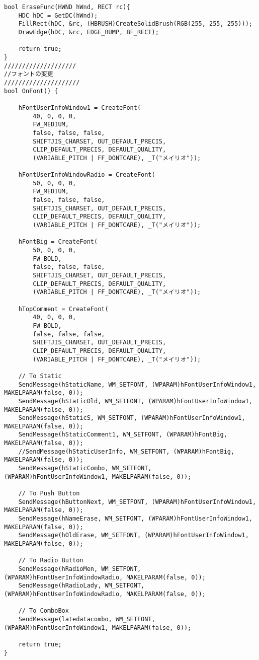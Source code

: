 \begin{lstlisting}[caption=UserInfoWindow.cpp]
bool EraseFunc(HWND hWnd, RECT rc){
	HDC hDC = GetDC(hWnd);
	FillRect(hDC, &rc, (HBRUSH)CreateSolidBrush(RGB(255, 255, 255)));
	DrawEdge(hDC, &rc, EDGE_BUMP, BF_RECT);

	return true;
}
////////////////////
//フォントの変更
/////////////////////
bool OnFont() {

	hFontUserInfoWindow1 = CreateFont(
		40, 0, 0, 0,
		FW_MEDIUM,
		false, false, false,
		SHIFTJIS_CHARSET, OUT_DEFAULT_PRECIS,
		CLIP_DEFAULT_PRECIS, DEFAULT_QUALITY,
		(VARIABLE_PITCH | FF_DONTCARE), _T("メイリオ"));

	hFontUserInfoWindowRadio = CreateFont(
		50, 0, 0, 0,
		FW_MEDIUM,
		false, false, false,
		SHIFTJIS_CHARSET, OUT_DEFAULT_PRECIS,
		CLIP_DEFAULT_PRECIS, DEFAULT_QUALITY,
		(VARIABLE_PITCH | FF_DONTCARE), _T("メイリオ"));

	hFontBig = CreateFont(
		50, 0, 0, 0,
		FW_BOLD,
		false, false, false,
		SHIFTJIS_CHARSET, OUT_DEFAULT_PRECIS,
		CLIP_DEFAULT_PRECIS, DEFAULT_QUALITY,
		(VARIABLE_PITCH | FF_DONTCARE), _T("メイリオ"));

	hTopComment = CreateFont(
		40, 0, 0, 0,
		FW_BOLD,
		false, false, false,
		SHIFTJIS_CHARSET, OUT_DEFAULT_PRECIS,
		CLIP_DEFAULT_PRECIS, DEFAULT_QUALITY,
		(VARIABLE_PITCH | FF_DONTCARE), _T("メイリオ"));

	// To Static
	SendMessage(hStaticName, WM_SETFONT, (WPARAM)hFontUserInfoWindow1, MAKELPARAM(false, 0));
	SendMessage(hStaticOld, WM_SETFONT, (WPARAM)hFontUserInfoWindow1, MAKELPARAM(false, 0));
	SendMessage(hStaticS, WM_SETFONT, (WPARAM)hFontUserInfoWindow1, MAKELPARAM(false, 0));
	SendMessage(hStaticComment1, WM_SETFONT, (WPARAM)hFontBig, MAKELPARAM(false, 0));
	//SendMessage(hStaticUserInfo, WM_SETFONT, (WPARAM)hFontBig, MAKELPARAM(false, 0));
	SendMessage(hStaticCombo, WM_SETFONT, (WPARAM)hFontUserInfoWindow1, MAKELPARAM(false, 0));

	// To Push Button
	SendMessage(hButtonNext, WM_SETFONT, (WPARAM)hFontUserInfoWindow1, MAKELPARAM(false, 0));
	SendMessage(hNameErase, WM_SETFONT, (WPARAM)hFontUserInfoWindow1, MAKELPARAM(false, 0));
	SendMessage(hOldErase, WM_SETFONT, (WPARAM)hFontUserInfoWindow1, MAKELPARAM(false, 0));

	// To Radio Button
	SendMessage(hRadioMen, WM_SETFONT, (WPARAM)hFontUserInfoWindowRadio, MAKELPARAM(false, 0));
	SendMessage(hRadioLady, WM_SETFONT, (WPARAM)hFontUserInfoWindowRadio, MAKELPARAM(false, 0));

	// To ComboBox
	SendMessage(latedatacombo, WM_SETFONT, (WPARAM)hFontUserInfoWindow1, MAKELPARAM(false, 0));

	return true;
}
\end{lstlisting}

